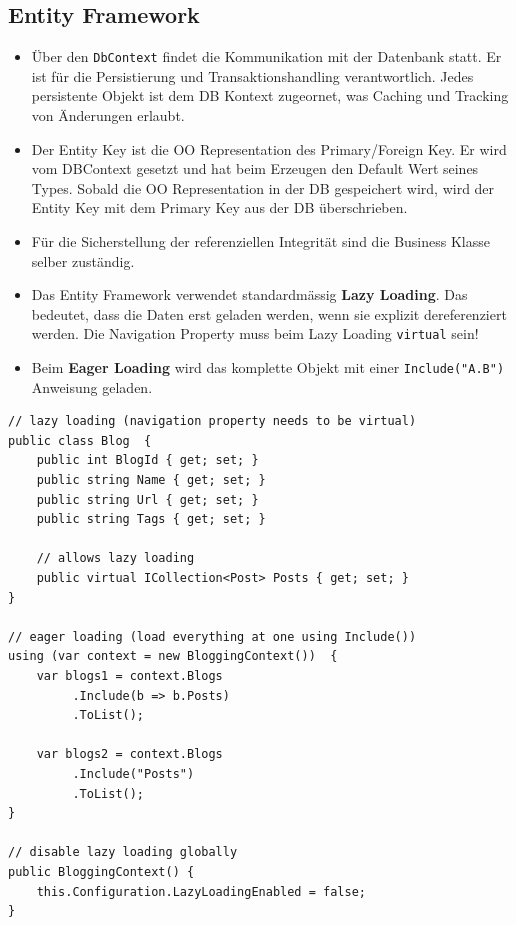 \documentclass[
a4paper,
oneside,
10pt,
fleqn,
headsepline,
toc=listofnumbered, 
bibliography=totocnumbered]{scrartcl}
\begin{document}
\subsection{Entity Framework}
\begin{itemize}
	\item Über den \lstinline|DbContext| findet die Kommunikation mit der Datenbank statt. Er ist für die Persistierung und Transaktionshandling verantwortlich. Jedes persistente Objekt ist dem DB Kontext zugeornet, was Caching und Tracking von Änderungen erlaubt.
	\item Der Entity Key ist die OO Representation des Primary/Foreign Key. Er wird vom DBContext gesetzt und hat beim Erzeugen den Default Wert seines Types. Sobald die OO Representation in der DB gespeichert wird, wird der Entity Key mit dem Primary Key aus der DB überschrieben.
	\item Für die Sicherstellung der referenziellen Integrität sind die Business Klasse selber zuständig.
	\item Das Entity Framework verwendet standardmässig \textbf{Lazy Loading}. Das bedeutet, dass die Daten erst geladen werden, wenn sie explizit dereferenziert werden. Die Navigation Property muss beim Lazy Loading \lstinline|virtual| sein!
	\item Beim \textbf{Eager Loading} wird das komplette Objekt mit einer \lstinline|Include("A.B")| Anweisung geladen.
\end{itemize}

\begin{lstlisting}
// lazy loading (navigation property needs to be virtual)
public class Blog  {  
	public int BlogId { get; set; }  
	public string Name { get; set; }  
	public string Url { get; set; }  
	public string Tags { get; set; }  
	
	// allows lazy loading
	public virtual ICollection<Post> Posts { get; set; }  
}

// eager loading (load everything at one using Include())
using (var context = new BloggingContext())  {
	var blogs1 = context.Blogs 
		 .Include(b => b.Posts) 
		 .ToList(); 
	
	var blogs2 = context.Blogs 
		 .Include("Posts") 
		 .ToList();
}

// disable lazy loading globally
public BloggingContext() { 
	this.Configuration.LazyLoadingEnabled = false; 
} 
\end{lstlisting}

\clearpage
\end{document}
